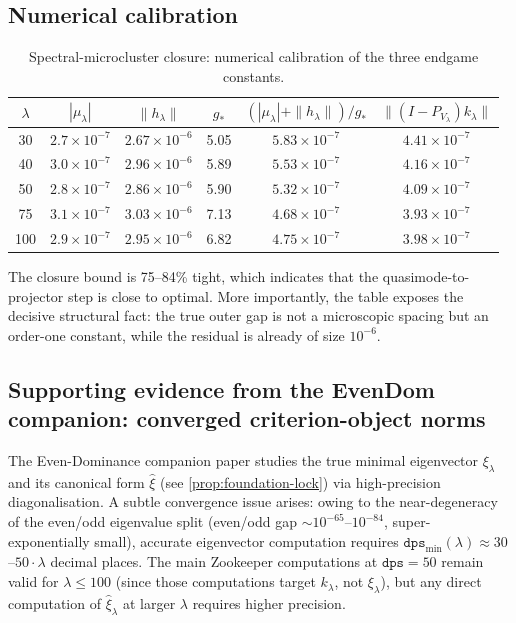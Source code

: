 \documentclass[12pt,a4paper]{article}
\theoremstyle{definition}
\theoremstyle{remark}
\newcommand{\norm}[1]{\| #1 \|}
\begin{document}
\subsection{Numerical calibration}

\begin{table}[h]
\centering
\caption{Spectral-microcluster closure: numerical calibration of the
three endgame constants.}
\label{tab:endgame}
\begin{tabular}{cccccc}
\toprule
$\lambda$ & $|\mu_\lambda|$ & $\norm{h_\lambda}$ & $g_*$ &
  $(|\mu_\lambda|+\norm{h_\lambda})/g_*$ &
  $\norm{(I-P_{V_\lambda})k_\lambda}$ \\
\midrule
30 & $2.7 \times 10^{-7}$ & $2.67 \times 10^{-6}$ & 5.05 & $5.83 \times 10^{-7}$ &
  $4.41 \times 10^{-7}$ \\
40 & $3.0 \times 10^{-7}$ & $2.96 \times 10^{-6}$ & 5.89 & $5.53 \times 10^{-7}$ &
  $4.16 \times 10^{-7}$ \\
50 & $2.8 \times 10^{-7}$ & $2.86 \times 10^{-6}$ & 5.90 & $5.32 \times 10^{-7}$ &
  $4.09 \times 10^{-7}$ \\
75 & $3.1 \times 10^{-7}$ & $3.03 \times 10^{-6}$ & 7.13 & $4.68 \times 10^{-7}$ &
  $3.93 \times 10^{-7}$ \\
100 & $2.9 \times 10^{-7}$ & $2.95 \times 10^{-6}$ & 6.82 & $4.75 \times 10^{-7}$ &
  $3.98 \times 10^{-7}$ \\
\bottomrule
\end{tabular}
\end{table}

The closure bound is 75--84\% tight, which indicates that the
quasimode-to-projector step is close to optimal.  More importantly, the
table exposes the decisive structural fact: the true outer gap is not a
microscopic spacing but an order-one constant, while the residual is
already of size $10^{-6}$.

\subsection{Supporting evidence from the EvenDom companion: converged criterion-object norms}
\label{subsec:evendom-empirics}

The Even-Dominance companion paper \cite{Geiger2026evendom} studies the
true minimal eigenvector $\xi_\lambda$ and its canonical form $\hat{\xi}$
(see \cref{prop:foundation-lock}) via high-precision diagonalisation.
A subtle convergence issue arises: owing to the near-degeneracy of the
even/odd eigenvalue split (even/odd gap $\sim 10^{-65}$--$10^{-84}$,
super-exponentially small), accurate eigenvector computation requires
$\mathtt{dps}_{\min}(\lambda) \approx 30$--$50 \cdot \lambda$ decimal
places.  The main Zookeeper computations at $\mathtt{dps}=50$ remain
valid for $\lambda \le 100$ (since those computations target $k_\lambda$,
not $\xi_\lambda$), but any direct computation of $\hat{\xi}_\lambda$ at
larger $\lambda$ requires higher precision.
\end{document}
